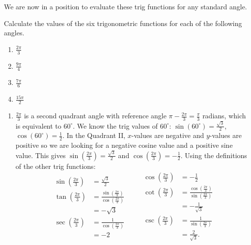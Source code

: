 \documentclass[nooutcomes]{ximera}
\begin{document}
We are now in a position to evaluate these trig functions for any standard angle.
\begin{exercise}
	Calculate the values of the six trigonometric functions for each of the following angles.
	\begin{enumerate}
		\item $\frac{2\pi}{3}$
		\item $\frac{9\pi}{4}$
		\item $\frac{7\pi}{6}$
		\item $\frac{15\pi}{2}$
	\end{enumerate}
	\begin{explanation}
		\begin{enumerate}
			\item 
				$\frac{2\pi}{3}$ is a second quadrant angle with reference angle $\pi - \frac{2\pi}{3} = \frac{\pi}{3}$ radians, which is equivalent to $60^\circ$.
				We know the trig values of $60^\circ$: $\sin(60^\circ)= \frac{\sqrt{3}}{2}$, $\cos(60^\circ) = \frac{1}{2}$.
				In the Quadrant II, $x$-values are negative and $y$-values are positive so we are looking for a negative cosine value and a positive sine value.
				This gives
				$\sin\left( \frac{2\pi}{3} \right) = \frac{\sqrt{3}}{2}$ and $\cos\left( \frac{2\pi}{3}\right) = -\frac{1}{2}$. Using the definitions of the other trig
				 functions:
				$$
				  \begin{aligned}
				  \sin\left( \frac{2\pi}{3} \right) &= \frac{\sqrt{3}}{2}\\
				  \tan\left( \frac{2\pi}{3} \right) &= \frac{\sin\left( \frac{2\pi}{3} \right)}{\cos\left( \frac{2\pi}{3} \right)}\\
					&= -\sqrt{3}\\
				  \sec\left( \frac{2\pi}{3} \right) &= \frac{1}{\cos\left( \frac{2\pi}{3} \right)}\\
				  	&= -2
				  \end{aligned}
				  \qquad
				  \begin{aligned}
				  \cos\left( \frac{2\pi}{3} \right) &= -\frac{1}{2}\\
				  \cot\left( \frac{2\pi}{3} \right) &= \frac{\cos\left( \frac{2\pi}{3} \right)}{\sin\left( \frac{2\pi}{3} \right)}\\
					&= -\frac{1}{\sqrt{3}}\\
				  \csc\left( \frac{2\pi}{3} \right) &= \frac{1}{\sin\left( \frac{2\pi}{3} \right)}\\
				  	&= \frac{2}{\sqrt{3}}.    
				  \end{aligned}
				  $$




\end{enumerate}
\end{explanation}
\end{exercise}
\end{document}
